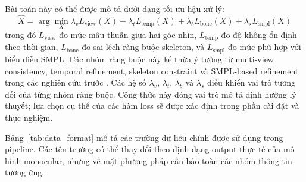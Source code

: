 \documentclass[../DoAn.tex]{subfiles}
\begin{document}
Bài toán này có thể được mô tả dưới dạng tối ưu hậu xử lý:
\[
\hat{X} = \arg\min_X
\lambda_v L_{\text{view}}(X)
+ \lambda_t L_{\text{temp}}(X)
+ \lambda_b L_{\text{bone}}(X)
+ \lambda_s L_{\text{smpl}}(X)
\]
trong đó $L_{\text{view}}$ đo mức mâu thuẫn giữa hai góc nhìn, $L_{\text{temp}}$ đo độ không ổn định theo thời gian, $L_{\text{bone}}$ đo sai lệch ràng buộc skeleton, và $L_{\text{smpl}}$ đo mức phù hợp với biểu diễn SMPL. Các nhóm ràng buộc này kế thừa ý tưởng từ multi-view consistency, temporal refinement, skeleton constraint và SMPL-based refinement trong các nghiên cứu trước \cite{canonpose2021,physcap2020,smplify2016,yang2025learnable}. Các hệ số $\lambda_v$, $\lambda_t$, $\lambda_b$ và $\lambda_s$ điều khiển vai trò tương đối của từng nhóm ràng buộc. Công thức này đóng vai trò mô tả định hướng lý thuyết; lựa chọn cụ thể của các hàm loss sẽ được xác định trong phần cài đặt và thực nghiệm.

Bảng~\ref{tab:data_format} mô tả các trường dữ liệu chính được sử dụng trong pipeline. Các tên trường có thể thay đổi theo định dạng output thực tế của mô hình monocular, nhưng về mặt phương pháp cần bảo toàn các nhóm thông tin tương ứng.
\end{document}
